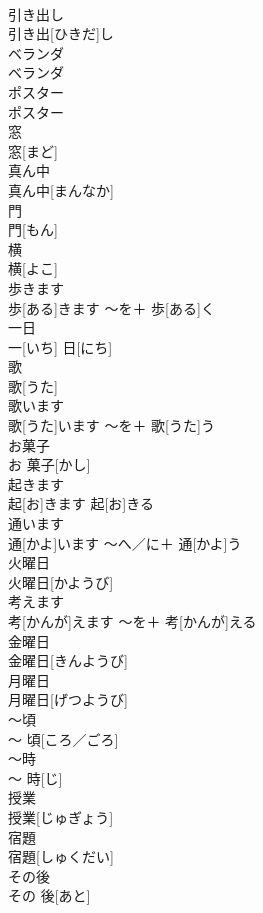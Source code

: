 \documentclass[8pt]{extreport}
\begin{document}
\begin{CJK}{UTF8}{min}
\\	引き出し	
\\	引き出[ひきだ]し		
\\	ベランダ	
\\	ベランダ		
\\	ポスター	
\\	ポスター		
\\	窓	
\\	窓[まど]		
\\	真ん中	
\\	真ん中[まんなか]		
\\	門	
\\	門[もん]		
\\	横	
\\	横[よこ]		
\\	歩きます	
\\	歩[ある]きます	〜を＋ 歩[ある]く	
\\	一日	
\\	一[いち] 日[にち]		
\\	歌	
\\	歌[うた]		
\\	歌います	
\\	歌[うた]います	〜を＋ 歌[うた]う	
\\	お菓子	
\\	お 菓子[かし]		
\\	起きます	
\\	起[お]きます	起[お]きる	
\\	通います	
\\	通[かよ]います	〜へ／に＋ 通[かよ]う	
\\	火曜日	
\\	火曜日[かようび]		
\\	考えます	
\\	考[かんが]えます	〜を＋ 考[かんが]える	
\\	金曜日	
\\	金曜日[きんようび]		
\\	月曜日	
\\	月曜日[げつようび]		
\\	〜頃	
\\	〜 頃[ころ／ごろ]		
\\	〜時	
\\	〜 時[じ]		
\\	授業	
\\	授業[じゅぎょう]		
\\	宿題	
\\	宿題[しゅくだい]		
\\	その後	
\\	その 後[あと]		

\end{CJK}
\end{document}
